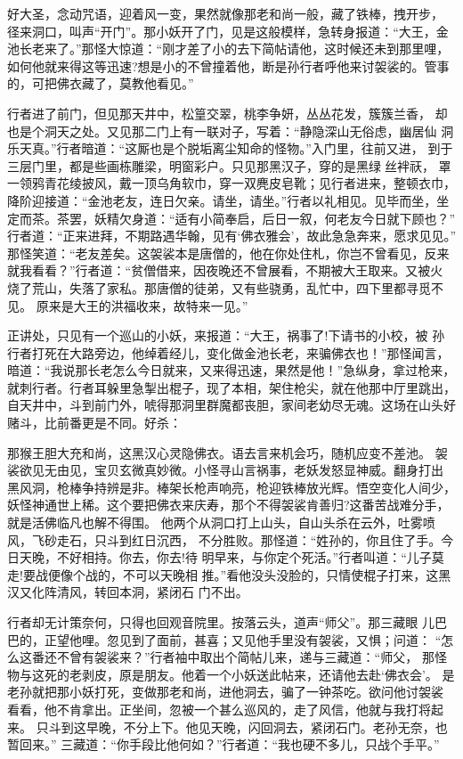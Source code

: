 好大圣，念动咒语，迎着风一变，果然就像那老和尚一般，藏了铁棒，拽开步，
径来洞口，叫声“开门”。那小妖开了门，见是这般模样，急转身报道：“大王，金
池长老来了。”那怪大惊道：“刚才差了小的去下简帖请他，这时候还未到那里哩，
如何他就来得这等迅速?想是小的不曾撞着他，断是孙行者呼他来讨袈裟的。管事
的，可把佛衣藏了，莫教他看见。”

行者进了前门，但见那天井中，松篁交翠，桃李争妍，丛丛花发，簇簇兰香，
却也是个洞天之处。又见那二门上有一联对子，写着：“静隐深山无俗虑，幽居仙
洞乐天真。”行者暗道：“这厮也是个脱垢离尘知命的怪物。”入门里，往前又进，
到于三层门里，都是些画栋雕梁，明窗彩户。只见那黑汉子，穿的是黑绿丝袢祆，
罩一领鸦青花绫披风，戴一顶乌角软巾，穿一双麂皮皂靴；见行者进来，整顿衣巾，
降阶迎接道：“金池老友，连日欠亲。请坐，请坐。”行者以礼相见。见毕而坐，坐
定而茶。茶罢，妖精欠身道：“适有小简奉启，后日一叙，何老友今日就下顾也？”
行者道：“正来进拜，不期路遇华翰，见有‘佛衣雅会’，故此急急奔来，愿求见见。”
那怪笑道：“老友差矣。这袈裟本是唐僧的，他在你处住札，你岂不曾看见，反来
就我看看？”行者道：“贫僧借来，因夜晚还不曾展看，不期被大王取来。又被火
烧了荒山，失落了家私。那唐僧的徒弟，又有些骁勇，乱忙中，四下里都寻觅不见。
原来是大王的洪福收来，故特来一见。”

正讲处，只见有一个巡山的小妖，来报道：“大王，祸事了!下请书的小校，被
孙行者打死在大路旁边，他绰着经儿，变化做金池长老，来骗佛衣也！”那怪闻言，
暗道：“我说那长老怎么今日就来，又来得迅速，果然是他！”急纵身，拿过枪来，
就刺行者。行者耳躲里急掣出棍子，现了本相，架住枪尖，就在他那中厅里跳出，
自天井中，斗到前门外，唬得那洞里群魔都丧胆，家间老幼尽无魂。这场在山头好
赌斗，比前番更是不同。好杀：

那猴王胆大充和尚，这黑汉心灵隐佛衣。语去言来机会巧，随机应变不差池。
袈裟欲见无由见，宝贝玄微真妙微。小怪寻山言祸事，老妖发怒显神威。翻身打出
黑风洞，枪棒争持辨是非。棒架长枪声响亮，枪迎铁棒放光辉。悟空变化人间少，
妖怪神通世上稀。这个要把佛衣来庆寿，那个不得袈裟肯善归?这番苦战难分手，
就是活佛临凡也解不得围。
他两个从洞口打上山头，自山头杀在云外，吐雾喷风，飞砂走石，只斗到红日沉西，
不分胜败。那怪道：“姓孙的，你且住了手。今日天晚，不好相持。你去，你去!待
明早来，与你定个死活。”行者叫道：“儿子莫走!要战便像个战的，不可以天晚相
推。”看他没头没脸的，只情使棍子打来，这黑汉又化阵清风，转回本洞，紧闭石
门不出。

行者却无计策奈何，只得也回观音院里。按落云头，道声“师父”。那三藏眼
儿巴巴的，正望他哩。忽见到了面前，甚喜；又见他手里没有袈裟，又惧；问道：
“怎么这番还不曾有袈裟来？”行者袖中取出个简帖儿来，递与三藏道：“师父，
那怪物与这死的老剥皮，原是朋友。他着一个小妖送此帖来，还请他去赴‘佛衣会’。
是老孙就把那小妖打死，变做那老和尚，进他洞去，骗了一钟茶吃。欲问他讨袈裟
看看，他不肯拿出。正坐间，忽被一个甚么巡风的，走了风信，他就与我打将起来。
只斗到这早晚，不分上下。他见天晚，闪回洞去，紧闭石门。老孙无奈，也暂回来。”
三藏道：“你手段比他何如？”行者道：“我也硬不多儿，只战个手平。”

